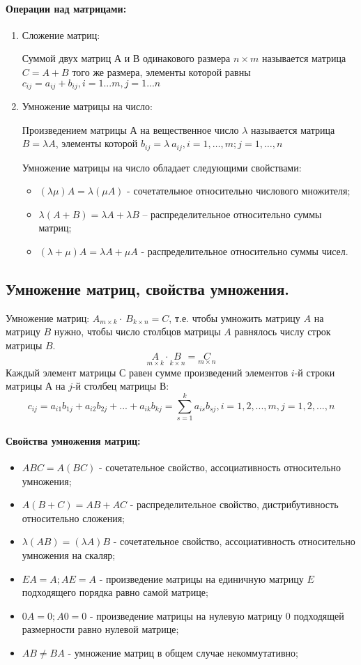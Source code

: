 \documentclass[a4paper,14pt]{article}
\begin{document}
\paragraph{Операции над матрицами:}
\begin{enumerate}
	\item Сложение матриц:
	
	Суммой двух матриц $А$ и $В$ одинакового размера $n \times m$ называется матрица $C=A+B$ того же размера, элементы которой равны $c_{ij}=a_{ij}+b_{ij}, i=1...m, j=1...n$
	\item Умножение матрицы на число:
	
	Произведением матрицы $А$ на вещественное число $\lambda$ называется матрица $B=\lambda A$, элементы которой $b_{ij}=\lambda\ a_{ij}, i=1,…,m; j=1,…,n$
	
	Умножение матрицы на число обладает следующими свойствами:
	\begin{itemize}
		\item $(\lambda\mu)A=\lambda (\mu A)$ - сочетательное относительно числового множителя;
		\item $\lambda(A+B)=\lambda A+\lambda B$ – распределительное относительно суммы матриц;
		\item $(\lambda+\mu) A=\lambda A + \mu A$ - распределительное относительно суммы чисел.
	\end{itemize}
\end{enumerate}
\subsection{Умножение матриц, свойства умножения.}
Умножение матриц: $A_{m\times k}\cdot\ B_{k\times n}=C$, т.е. чтобы умножить матрицу $A$ на матрицу $B$ нужно, чтобы число столбцов матрицы $A$ равнялось числу строк матрицы $B$.
\[\underset{m \times k}{A} \cdot \underset{k \times n}{B} = \underset{m \times n}{C}\]
Каждый элемент матрицы $С$ равен сумме произведений элементов $i$-й строки матрицы $А$ на $j$-й столбец матрицы $В$:
\[c_{ij}=a_{i1}b_{1j}+a_{i2}b_{2j}+...+a_{ik}b_{kj}=\sum\limits_{s=1}^k a_{is}b_{sj}, i=1,2,...,m, j=1,2,...,n\]
\paragraph{Свойства умножения матриц:}
\begin{itemize}
	\item ${AB}C=A(BC)$ - сочетательное свойство, ассоциативность относительно умножения;
	\item $A(B+C)=AB+AC$ - распределительное свойство, дистрибутивность относительно сложения;
	\item $\lambda(AB)=(\lambda A)B$ - сочетательное свойство, ассоциативность относительно умножения на скаляр;
	\item $EA=A; AE=A$ - произведение матрицы на единичную матрицу $E$ подходящего порядка равно самой матрице;
	\item $0A=0; A0=0$ - произведение матрицы на нулевую матрицу $0$ подходящей размерности равно нулевой матрице;
	\item $AB \ne BA$ - умножение матриц в общем случае некоммутативно;
\end{itemize}
\end{document}
